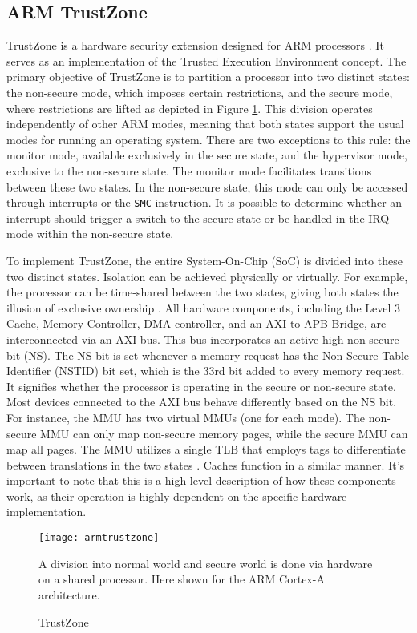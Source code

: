 \subsection{ARM TrustZone}
TrustZone is a hardware security extension designed for ARM processors \cite{Pinto}. It
serves as an implementation of the Trusted Execution Environment concept. The
primary objective of TrustZone is to partition a processor into two distinct
states: the non-secure mode, which imposes certain restrictions, and the secure
mode, where restrictions are lifted as depicted in Figure \ref{fig:ARM}. This division
operates independently of other ARM modes, meaning that both states support the
usual modes for running an operating system. There are two exceptions to this
rule: the monitor mode, available exclusively in the secure state, and the
hypervisor mode, exclusive to the non-secure state. The monitor mode facilitates
transitions between these two states. In the non-secure state, this mode can
only be accessed through interrupts or the \texttt{SMC} instruction. It is possible to
determine whether an interrupt should trigger a switch to the secure state or be
handled in the IRQ mode within the non-secure state.\par
To implement TrustZone, the entire System-On-Chip (SoC) is divided into these
two distinct states. Isolation can be achieved physically or virtually. For
example, the processor can be time-shared between the two states, giving both
states the illusion of exclusive ownership \cite{ARM}. All hardware components,
including the Level 3 Cache, Memory Controller, DMA controller, and an AXI to
APB Bridge, are interconnected via an AXI bus. This bus incorporates an
active-high non-secure bit (NS). The NS bit is set whenever a memory request has
the Non-Secure Table Identifier (NSTID) bit set, which is the 33rd bit added to
every memory request. It signifies whether the processor is operating in the
secure or non-secure state. Most devices connected to the AXI bus behave
differently based on the NS bit. For instance, the MMU has two virtual MMUs (one
for each mode). The non-secure MMU can only map non-secure memory pages, while
the secure MMU can map all pages. The MMU utilizes a single TLB that employs
tags to differentiate between translations in the two states \cite{ARM}. Caches function
in a similar manner. It's important to note that this is a high-level
description of how these components work, as their operation is highly dependent
on the specific hardware implementation.\par
\begin{figure}[h]
    \centering
    \texttt{[image: armtrustzone]}
    \caption{TrustZone}
    A division into normal world and secure world is done via hardware on a
    shared processor. Here shown for the ARM Cortex-A architecture.
    \label{fig:ARM}
\end{figure}
